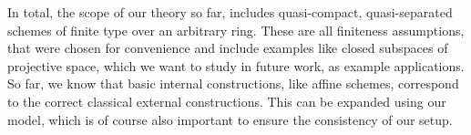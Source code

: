 In total, the scope of our theory so far, includes quasi-compact, quasi-separated schemes of finite type over an arbitrary ring.
These are all finiteness assumptions, that were chosen for convenience and include examples like closed subspaces of projective space,
which we want to study in future work, as example applications.
So far, we know that basic internal constructions, like affine schemes, correspond to the correct classical external constructions.
This can be expanded using our model, which is of course also important to ensure the consistency of our setup.
